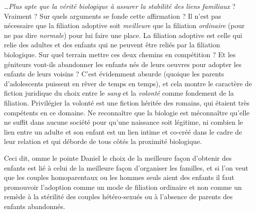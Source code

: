 \emph{…Plus apte que la vérité biologique à assurer la stabilité des liens familiaux} ? Vraiment ? Sur quels arguments se fonde cette affirmation ? Il n'est pas nécessaire que la filiation adoptive soit \emph{meilleure} que la filiation \emph{ordinaire} (pour ne pas dire \emph{normale}) pour lui faire une place. La filiation adoptive est celle qui relie des adultes et des enfants qui ne peuvent être reliés par la filiation biologique. Sur quel terrain mettre ces deux chemins en compétition ? Et les géniteurs vont-ils abandonner les enfants nés de leurs oeuvres pour adopter les enfants de leurs voisins ? C'est évidemment absurde (quoique les parents d'adolescents puissent en rêver de temps en temps), et cela montre le caractère de fiction juridique du choix entre le \emph{sang} et la \emph{volonté} comme fondement de la filiation. Privilégier la volonté est une fiction héritée des romains, qui étaient très compétents en ce domaine. Ne reconnaître que la biologie est méconnaître qu'elle ne suffit dans aucune société pour qu'une naissance soit légitime, ni combien le lien entre un adulte et son enfant est un lien intime et co-créé dans le cadre de leur relation et qui déborde de tous côtés la proximité biologique. 

Ceci dit, omme le pointe Daniel  le choix de la meilleure façon d'obtenir des enfants est lié à celui de la meilleure façon d'organiser les familles, et si l'on veut que les couples homoparentaux ou les hommes seuls aient des enfants il faut promouvoir l'adoption comme un mode de filiation ordinaire et non comme un remède à la stérilité des couples hétéro-sexués ou à l'absence de parents des enfants abandonnés. 
 

